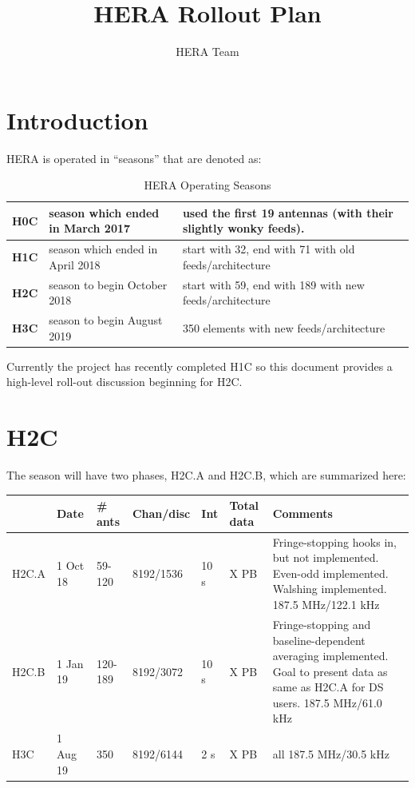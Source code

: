\documentclass{article}
\begin{document}
\author{HERA Team}
\title{HERA Rollout Plan}
\maketitle

\setcounter{section}{-1}
\section{Introduction}
HERA is operated in ``seasons'' that are denoted as:

\vspace{-0.25in}
\begin{table}[H]
\caption{HERA Operating Seasons}
\begin{tabular}{p{0.5in} p{2.2in} p{3.5in}} \hline
{\bf H0C} & season which ended in March 2017 & used the first 19 antennas (with their slightly wonky feeds). \\ \hline
{\bf H1C} & season which ended in April 2018    & start with 32, end with 71 with old feeds/architecture\\ \hline
{\bf H2C} & season to begin October 2018         & start with 59, end with 189 with new feeds/architecture\\ \hline
{\bf H3C} & season to begin August 2019           & 350 elements with new feeds/architecture \\ \hline
\end{tabular}
\end{table}

Currently the project has recently completed H1C so this document provides a high-level roll-out discussion beginning for H2C.


\section{H2C}
The season will have two phases, H2C.A and H2C.B, which are summarized here:

\vspace{0.5cm}
\begin{tabular}{l l l l l l p{2.2in}}
 & \textbf{Date} & \textbf{\# ants} & \textbf{Chan/disc} & \textbf{Int} & \textbf{Total data} & \textbf{Comments} \\ \hline
H2C.A & 1 Oct 18 &  59-120   & 8192/1536 & 10 s&  X PB& Fringe-stopping hooks in, but not implemented.  Even-odd implemented. Walshing implemented. 187.5 MHz/122.1 kHz\\ \hline
H2C.B & 1 Jan 19 & 120-189 & 8192/3072 & 10 s& X PB & Fringe-stopping and baseline-dependent averaging implemented.  Goal to present data as same as H2C.A for DS users. 187.5 MHz/61.0 kHz\\ \hline
H3C    & 1 Aug 19 &  350       & 8192/6144 & 2  s&  X PB & all 187.5 MHz/30.5 kHz\\ \hline
\end{tabular}
\vspace{1cm}
\end{document}
